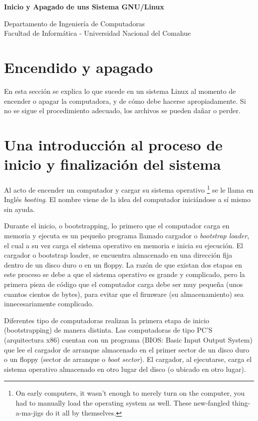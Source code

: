 \documentclass[12pt]{article}
\def\maketitle{

 \makeatletter
 {\color{bl} \centering \huge \sc \textbf{
 Inicio y Apagado de uns Sistema GNU/Linux \\ 
 \vspace*{8pt} }\par}
 \makeatother


 \makeatletter
 {\centering \small 
 	Departamento de Ingeniería de Computadoras \\
 	Facultad de Informática - Universidad Nacional del Comahue \\
 	\vspace{20pt} }
 \makeatother

}
\begin{document}
\thispagestyle{empty}
\maketitle
\setlength{\parindent}{0pt}



\section{Encendido y apagado}


 En esta sección se explica lo que sucede en un sistema Linux al momento
de encender o apagar la computadora, y de cómo debe hacerse apropiadamente. Si
no se sigue el procedimiento adecuado, los archivos se pueden dañar o perder.


\section{ Una introducción al proceso de inicio y finalización del
sistema}

Al acto de encender un computador y cargar su sistema operativo 
		\footnote{On early computers, it wasn't enough to merely
		turn on the computer, you had to manually load the operating
		system as well.  These new-fangled thing-a-ma-jigs do it all by
		themselves.} 
se le llama en Inglés \textit{booting}. El nombre viene de
la idea del computador iniciándose a sí mismo sin ayuda.  

Durante el inicio, o bootstrapping, lo primero que el computador carga en
memoria y ejecuta es un pequeño programa llamado cargador o \textit{bootstrap
loader}, el cual a su vez carga el sistema operativo en memoria e
inicia su ejecución. El cargador o bootstrap loader, se encuentra almacenado en
una dirección fija dentro de un disco duro o en un floppy. La razón de que
existan dos etapas en este proceso se debe a que el sistema operativo es grande
y complicado, pero la primera pieza de código que el computador carga debe ser
muy pequeña (unos cuantos cientos de bytes), para evitar que el firmware (su
almacenamiento) sea innecesariamente complicado.  

 Diferentes tipo de computadoras realizan la primera etapa de inicio
(bootstrapping) de manera distinta. Las computadoras de tipo PC'S (arquitectura
x86) cuentan con un programa (BIOS: Basic Input Output System) que lee el
cargador de arranque almacenado en el primer sector de un disco duro o un floppy
(sector de arranque o \textit{boot sector}). El cargador, al
ejecutarse, carga el sistema operativo almacenado en otro lugar del disco (o
ubicado en otro lugar).  
\end{document}

